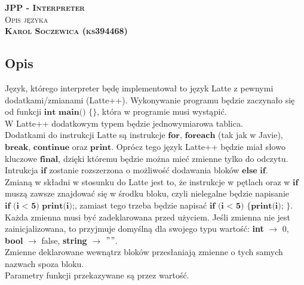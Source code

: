 \documentclass[a4paper]{article}
\begin{document}
\begin{center}
    \textsc{\textbf{\LARGE JPP - Interpreter}}\\
    \textsc{\large Opis języka}\\
    \textsc{\bf Karol Soczewica (ks394468)}
\end{center}

\subsection*{Opis}
Język, którego interpreter będę implementował to język Latte z pewnymi dodatkami/zmianami (Latte++).
Wykonywanie programu będzie zaczynało się od funkcji $\textbf{int main() \{\}}$, która w programie
musi wystąpić.\\
W Latte++ dodatkowym typem będzie jednowymiarowa tablica.\\ 
Dodatkami do instrukcji Latte są instrukcje $\textbf{for}$, $\textbf{foreach}$ (tak jak w Javie), 
$\textbf{break}$, $\textbf{continue}$ oraz $\textbf{print}$. Oprócz tego język Latte++ będzie miał
słowo kluczowe $\textbf{final}$, dzięki któremu będzie można mieć zmienne tylko do odczytu.
Intrukcja $\textbf{if}$ zostanie rozszerzona o możliwość dodawania bloków $\textbf{else if}$.\\
Zmianą w składni w stosunku do Latte jest to, że instrukcje w pętlach oraz w $\textbf{if}$ muszą
zawsze znajdować się w środku bloku, czyli nielegalne będzie napisanie $\textbf{if (i < 5) print(i);}$,
zamiast tego trzeba będzie napisać $\textbf{if (i < 5) \{ print(i); \}}$.\\
Każda zmienna musi być zadeklarowana przed użyciem. Jeśli zmienna nie jest zainicjalizowana, to
przyjmuje domyślną dla swojego typu wartość: \textbf{int} $\rightarrow$ 0, \textbf{bool} $\rightarrow$ false,
\textbf{string} $\rightarrow$ $"$$"$.\\
Zmienne deklarowane wewnątrz bloków przesłaniają zmienne o tych samych nazwach spoza bloku.\\
Parametry funkcji przekazywane są przez wartość.
\end{document}
